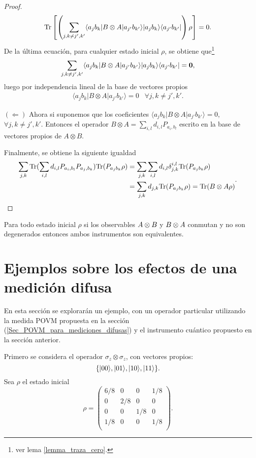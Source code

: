 \begin{proof}
\[\begin{split}
    {\rm Tr}\left[\left(\sum_{j,k\ne j',k'}  \langle a_j b_k |B\otimes A|a_{j'}b_{k'}\rangle |a_j b_k\rangle \langle a_{j'}b_{k'}|\right)\rho\right]&=0.\\
    \end{split}\]
    De la última ecuación, para cualquier estado inicial $\rho$, se obtiene que\footnote[1]{ver lema {\ref{lemma_traza_cero}}.} 
    \[\sum_{j,k\ne j', k'} \langle a_j b_k |B\otimes A|a_{j'}b_{k'}\rangle |a_j b_k\rangle \langle a_{j'}b_{k'}|=\mathbf{0},\] luego por independencia lineal de la base de vectores propios  
     \[\begin{array}{cc}
        \langle a_j b_k |B\otimes A|a_{j'}b_{k'}\rangle=0& \forall j,k\ne j',k'.\end{array}\]

        $(\Leftarrow)$
        Ahora si suponemos que los coeficientes  $\langle a_j b_k |B\otimes A|a_{j'}b_{k'}\rangle=0$,  $\forall j,k\ne j',k'$. Entonces el operador $B\otimes A=\sum_{i,l}d_{i,l}P_{a_i, b_l}$ escrito en la base de vectores propios de $A\otimes B$.
        
        Finalmente, se obtiene la siguiente igualdad \[\begin{split}\sum_{j,k}{\rm Tr}( \sum_{i,l}d_{i,l}P_{a_i, b_l} P_{a_j,b_k}){\rm Tr}(P_{a_j b_k}\rho )&=\sum_{j,k}\sum_{i,l}d_{i,l}\delta_{j,k}^{i,l}{\rm Tr}(P_{a_j b_k}\rho )\\&=\sum_{j,k}d_{j,k}{\rm Tr}(P_{a_j b_k}\rho )={\rm Tr}(B\otimes A\rho)\end{split}.\]


\end{proof}

\begin{corollary}
   Para todo estado inicial $\rho$ si los observables $A\otimes B$ y $B\otimes A$ conmutan y  no son degenerados entonces ambos instrumentos son equivalentes.
\end{corollary}


\section{Ejemplos sobre los efectos de una medición difusa} %

En esta sección se explorarán un ejemplo, con un operador particular utilizando la medida POVM propuesta en la sección ({\ref{Sec_POVM_para_mediciones_difusas}}) y el instrumento cuántico propuesto en la sección anterior.


Primero se considera el operador $\sigma_z \otimes \sigma_z$, con vectores propios: \[\{|00\rangle, |01\rangle, |10\rangle, |11\rangle\}.\] Sea $\rho $ el estado inicial\[\rho={\begin{pmatrix}6/8&0&0 &1/8\\0&2/8&0 &0\\0 &0 &1/8 &0 \\1/8&0&0&1/8\\\end{pmatrix}}.\]

